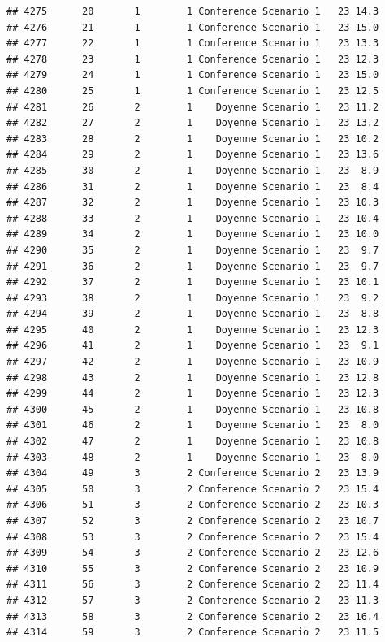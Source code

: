 \documentclass[
]{article}
\begin{document}
\begin{verbatim}
## 4275      20       1        1 Conference Scenario 1   23 14.3
## 4276      21       1        1 Conference Scenario 1   23 15.0
## 4277      22       1        1 Conference Scenario 1   23 13.3
## 4278      23       1        1 Conference Scenario 1   23 12.3
## 4279      24       1        1 Conference Scenario 1   23 15.0
## 4280      25       1        1 Conference Scenario 1   23 12.5
## 4281      26       2        1    Doyenne Scenario 1   23 11.2
## 4282      27       2        1    Doyenne Scenario 1   23 13.2
## 4283      28       2        1    Doyenne Scenario 1   23 10.2
## 4284      29       2        1    Doyenne Scenario 1   23 13.6
## 4285      30       2        1    Doyenne Scenario 1   23  8.9
## 4286      31       2        1    Doyenne Scenario 1   23  8.4
## 4287      32       2        1    Doyenne Scenario 1   23 10.3
## 4288      33       2        1    Doyenne Scenario 1   23 10.4
## 4289      34       2        1    Doyenne Scenario 1   23 10.0
## 4290      35       2        1    Doyenne Scenario 1   23  9.7
## 4291      36       2        1    Doyenne Scenario 1   23  9.7
## 4292      37       2        1    Doyenne Scenario 1   23 10.1
## 4293      38       2        1    Doyenne Scenario 1   23  9.2
## 4294      39       2        1    Doyenne Scenario 1   23  8.8
## 4295      40       2        1    Doyenne Scenario 1   23 12.3
## 4296      41       2        1    Doyenne Scenario 1   23  9.1
## 4297      42       2        1    Doyenne Scenario 1   23 10.9
## 4298      43       2        1    Doyenne Scenario 1   23 12.8
## 4299      44       2        1    Doyenne Scenario 1   23 12.3
## 4300      45       2        1    Doyenne Scenario 1   23 10.8
## 4301      46       2        1    Doyenne Scenario 1   23  8.0
## 4302      47       2        1    Doyenne Scenario 1   23 10.8
## 4303      48       2        1    Doyenne Scenario 1   23  8.0
## 4304      49       3        2 Conference Scenario 2   23 13.9
## 4305      50       3        2 Conference Scenario 2   23 15.4
## 4306      51       3        2 Conference Scenario 2   23 10.3
## 4307      52       3        2 Conference Scenario 2   23 10.7
## 4308      53       3        2 Conference Scenario 2   23 15.4
## 4309      54       3        2 Conference Scenario 2   23 12.6
## 4310      55       3        2 Conference Scenario 2   23 10.9
## 4311      56       3        2 Conference Scenario 2   23 11.4
## 4312      57       3        2 Conference Scenario 2   23 11.3
## 4313      58       3        2 Conference Scenario 2   23 16.4
## 4314      59       3        2 Conference Scenario 2   23 11.5

\end{verbatim}
\end{document}
